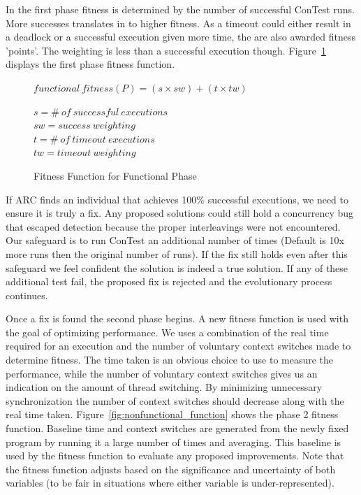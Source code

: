 \documentclass[10pt, conference, compsocconf]{IEEEtran}
\begin{document}
In the first phase fitness is determined by the number of successful ConTest
runs. More successes translates in to higher fitness. As a timeout could either 
result in a deadlock or a successful execution given more time, the are also 
awarded fitness 'points'. The weighting is less than a successful execution
though. Figure~\ref{fig:functional_fitness} displays the first phase fitness 
function.

\begin{figure}
\begin{footnotesize}
\begin{center}
$functional\ fitness(P) = (s \times sw) + (t \times tw)$
\end{center}
\end{footnotesize}
\begin{tiny}
\begin{center}
$s = \#\ of\ successful\ executions$ \\
$sw = success\ weighting$ \\
$t = \#\ of\ timeout\ executions$ \\
$tw = timeout\ weighting$
\end{center}
\end{tiny}
\caption{Fitness Function for Functional Phase}
\label{fig:functional_fitness}
\end{figure}

If ARC finds an individual that achieves 100\% successful executions, we need to ensure it is truly a fix. Any proposed solutions could still hold a
concurrency bug that escaped detection because the proper interleavings were not encountered. Our safeguard is to run ConTest an additional number of times (Default is 10x more runs then the original number of runs). If the fix still holds even after this safeguard we feel confident the solution is indeed a true solution. If any of these additional test fail, the proposed fix is rejected and the evolutionary process continues.

Once a fix is found the second phase begins.  A new fitness function is used 
with the goal of optimizing performance.  We uses a combination of the real time required for an execution and the number of voluntary context switches made to determine fitness.
The time taken is an obvious choice to use to measure the performance, while the number of voluntary context switches gives us an indication on the amount of thread switching. By minimizing unnecessary synchronization the number of context switches should decrease along with the real time taken.
Figure~\ref{fig:nonfunctional_function} shows the phase 2 fitness function. 
Baseline time and context switches are generated from the newly fixed program by running it a large number of times and averaging. This baseline is used by the fitness function to evaluate any proposed improvements. Note that the fitness function adjusts based on the significance and uncertainty of both variables (to be fair in situations where either variable is under-represented).
\end{document}
